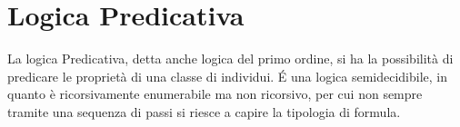\chapter{Logica Predicativa}
La logica Predicativa, detta anche logica del primo ordine, si ha la possibilità
di predicare le proprietà di una classe di individui.\newline
É una logica semidecidibile, in quanto è ricorsivamente enumerabile ma non ricorsivo,
per cui non sempre tramite una sequenza di passi si riesce a capire la tipologia di formula.












